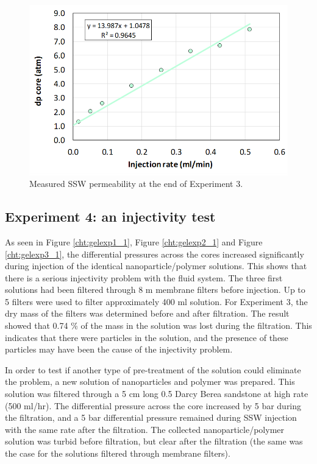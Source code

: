 \begin{figure}[h!]
    \centering
    \includegraphics[width=\textwidth]{img/cht/gelexp3_4.png}
    \caption{Measured SSW permeability at the end of Experiment 3.}
    \label{cht:gelexp3_4} %
\end{figure}

\FloatBarrier
\subsection{Experiment 4: an injectivity test}
 As seen in Figure \ref{cht:gelexp1_1}, Figure \ref{cht:gelexp2_1} and Figure \ref{cht:gelexp3_1}, the differential pressures across the cores increased significantly during injection of the identical nanoparticle/polymer solutions. This shows that there is a serious injectivity problem with the fluid system. The three first solutions had been filtered through 8 \micro m membrane filters before injection. Up to 5 filters were used to filter approximately 400 ml solution. For Experiment 3, the dry mass of the filters was determined before and after filtration. The result showed that 0.74 \% of the mass in the solution was lost during the filtration. This indicates that there were particles in the solution, and the presence of these particles may have been the cause of the injectivity problem.

In order to test if another type of pre-treatment of the solution could eliminate the problem, a new solution of nanoparticles and polymer was prepared. This solution was filtered through a 5 cm long 0.5 Darcy Berea sandstone at high rate (500 ml/hr). The differential pressure across the core increased by 5 bar during the filtration, and a 5 bar differential pressure remained during SSW injection with the same rate after the filtration. The collected nanoparticle/polymer solution was turbid before filtration, but clear after the filtration (the same was the case for the solutions filtered through membrane filters).

